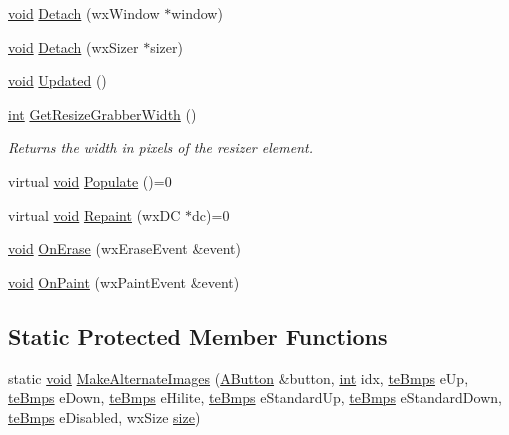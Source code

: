 \begin{DoxyCompactItemize}
\hyperlink{sound_8c_ae35f5844602719cf66324f4de2a658b3}{void} \hyperlink{class_tool_bar_ae7c77e4823e5349f4f47791eba17146a}{Detach} (wx\+Window $\ast$window)
\item 
\hyperlink{sound_8c_ae35f5844602719cf66324f4de2a658b3}{void} \hyperlink{class_tool_bar_aa38f324e7d209bc2f0f30273b4ec9831}{Detach} (wx\+Sizer $\ast$sizer)
\item 
\hyperlink{sound_8c_ae35f5844602719cf66324f4de2a658b3}{void} \hyperlink{class_tool_bar_ad0f4afa34adbcb33699972f3cc4fcec7}{Updated} ()
\item 
\hyperlink{xmltok_8h_a5a0d4a5641ce434f1d23533f2b2e6653}{int} \hyperlink{class_tool_bar_ac7a52b30048628863a3998ccc131fe7f}{Get\+Resize\+Grabber\+Width} ()
\begin{DoxyCompactList}\small\item\em Returns the width in pixels of the resizer element. \end{DoxyCompactList}\item 
virtual \hyperlink{sound_8c_ae35f5844602719cf66324f4de2a658b3}{void} \hyperlink{class_tool_bar_a25987a59644f59fc17d98e5ed28d33dd}{Populate} ()=0
\item 
virtual \hyperlink{sound_8c_ae35f5844602719cf66324f4de2a658b3}{void} \hyperlink{class_tool_bar_acc1502ccd89f45d0bff1230f617257d1}{Repaint} (wx\+DC $\ast$dc)=0
\item 
\hyperlink{sound_8c_ae35f5844602719cf66324f4de2a658b3}{void} \hyperlink{class_tool_bar_aec9ba1f360764ffa763a83ad36be9f23}{On\+Erase} (wx\+Erase\+Event \&event)
\item 
\hyperlink{sound_8c_ae35f5844602719cf66324f4de2a658b3}{void} \hyperlink{class_tool_bar_a8396b5f2d0b88e0b1965d5510ad4b6f0}{On\+Paint} (wx\+Paint\+Event \&event)
\end{DoxyCompactItemize}
\subsection*{Static Protected Member Functions}
\begin{DoxyCompactItemize}
\item 
static \hyperlink{sound_8c_ae35f5844602719cf66324f4de2a658b3}{void} \hyperlink{class_tool_bar_aac493a6017bc42b782067986e7514dc7}{Make\+Alternate\+Images} (\hyperlink{class_a_button}{A\+Button} \&button, \hyperlink{xmltok_8h_a5a0d4a5641ce434f1d23533f2b2e6653}{int} idx, \hyperlink{_theme_8h_a2beab2c3ca8cfcbb2cc0a1e27138dcf4}{te\+Bmps} e\+Up, \hyperlink{_theme_8h_a2beab2c3ca8cfcbb2cc0a1e27138dcf4}{te\+Bmps} e\+Down, \hyperlink{_theme_8h_a2beab2c3ca8cfcbb2cc0a1e27138dcf4}{te\+Bmps} e\+Hilite, \hyperlink{_theme_8h_a2beab2c3ca8cfcbb2cc0a1e27138dcf4}{te\+Bmps} e\+Standard\+Up, \hyperlink{_theme_8h_a2beab2c3ca8cfcbb2cc0a1e27138dcf4}{te\+Bmps} e\+Standard\+Down, \hyperlink{_theme_8h_a2beab2c3ca8cfcbb2cc0a1e27138dcf4}{te\+Bmps} e\+Disabled, wx\+Size \hyperlink{group__lavu__mem_ga854352f53b148adc24983a58a1866d66}{size})
\end{DoxyCompactItemize}
